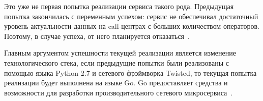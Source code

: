 Это уже не первая попытка реализации сервиса такого рода.
Предыдущая попытка закончилась с переменным успехом: сервис не обеспечивал достаточный уровень актуальности данных
на call-центрах с больших количеством операторов.
Поэтому, в случае успеха, от него планируется отказаться~\cite{go:sharedmem}.

Главным аргументом успешности текущей реализации является изменение технологического стека,
если предыдущие попытки были реализованы с помощью языка Python 2.7 и сетевого фрэймворка Twisted, %
то текущая попытка реализации будет выполнена на языке Go.
Go предоставляет средства и возможности для разработки производительного сетевого микросервиса~\cite{youtube:go}.



